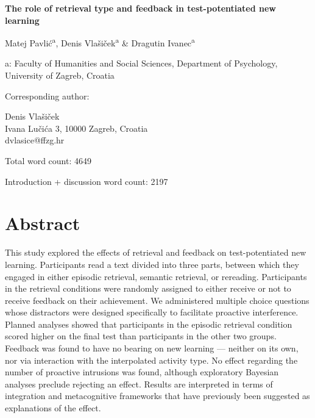\documentclass[12pt]{article}
\def\biblio{}
\begin{document}
\begin{titlepage}
    \begin{center}

        \vspace*{\fill}

        \Large
        \textbf{The role of retrieval type and feedback in test-potentiated 
        new learning}
        \normalsize

        \bigskip
        Matej Pavlić\textsuperscript{a}, Denis Vlašiček\textsuperscript{a} 
        \& Dragutin Ivanec\textsuperscript{a}

        a: Faculty of Humanities and Social Sciences, Department of 
        Psychology, University of Zagreb, Croatia

        \bigskip

        \raggedright
        Corresponding author:

        Denis Vlašiček\\
        Ivana Lučića 3, 10000 Zagreb, Croatia\\
        dvlasice@ffzg.hr

		\bigskip
		Total word count: 4649
		
		Introduction + discussion word count: 2197
		
        \vspace*{\fill}

    \end{center}

\end{titlepage}

\def\biblio{}

\section{Abstract}

This study explored the effects of retrieval and feedback on 
test-potentiated new learning. Participants read a text divided into three 
parts, between which they engaged in either episodic retrieval, semantic 
retrieval, or rereading. Participants in the retrieval conditions were 
randomly assigned to either receive or not to receive feedback on their 
achievement. We administered multiple choice questions whose distractors 
were designed specifically to facilitate proactive interference. Planned 
analyses showed that participants in the episodic retrieval condition scored 
higher on the final test than participants in the other two groups. Feedback 
was found to have no bearing on new learning --- neither on its own, nor via 
interaction with the interpolated activity type. No effect regarding the 
number of proactive intrusions was found, although exploratory Bayesian 
analyses preclude rejecting an effect. Results are interpreted in terms of 
integration and metacognitive frameworks that have previously been suggested 
as explanations of the effect.
\end{document}
